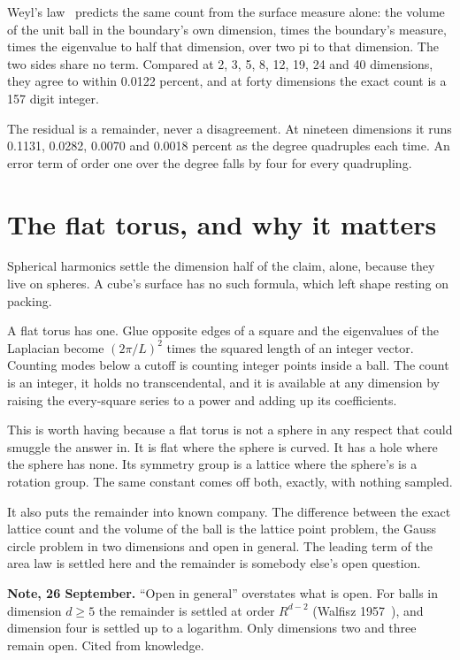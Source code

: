 Weyl's law~\cite{src:Weyl-1911} predicts the same count from the surface measure alone: the volume of the unit ball in the boundary's own dimension, times the boundary's measure, times the eigenvalue to half that dimension, over two pi to that dimension. The two sides share no term. Compared at 2, 3, 5, 8, 12, 19, 24 and 40 dimensions, they agree to within 0.0122 percent, and at forty dimensions the exact count is a 157 digit integer.

The residual is a remainder, never a disagreement. At nineteen dimensions it runs 0.1131, 0.0282, 0.0070 and 0.0018 percent as the degree quadruples each time. An error term of order one over the degree falls by four for every quadrupling.

\section{The flat torus, and why it matters}

Spherical harmonics settle the dimension half of the claim, alone, because they live on spheres. A cube's surface has no such formula, which left shape resting on packing.

A flat torus has one. Glue opposite edges of a square and the eigenvalues of the Laplacian become $(2\pi/L)^2$ times the squared length of an integer vector. Counting modes below a cutoff is counting integer points inside a ball. The count is an integer, it holds no transcendental, and it is available at any dimension by raising the every-square series to a power and adding up its coefficients.

This is worth having because a flat torus is not a sphere in any respect that could smuggle the answer in. It is flat where the sphere is curved. It has a hole where the sphere has none. Its symmetry group is a lattice where the sphere's is a rotation group. The same constant comes off both, exactly, with nothing sampled.

It also puts the remainder into known company. The difference between the exact lattice count and the volume of the ball is the lattice point problem, the Gauss circle problem in two dimensions and open in general. The leading term of the area law is settled here and the remainder is somebody else's open question.

\textbf{Note, 26 September.} ``Open in general'' overstates what is open. For balls in dimension $d \ge 5$ the remainder is settled at order $R^{d-2}$ (Walfisz 1957~\cite{src:Walfisz-1957}), and dimension four is settled up to a logarithm. Only dimensions two and three remain open. Cited from knowledge.

